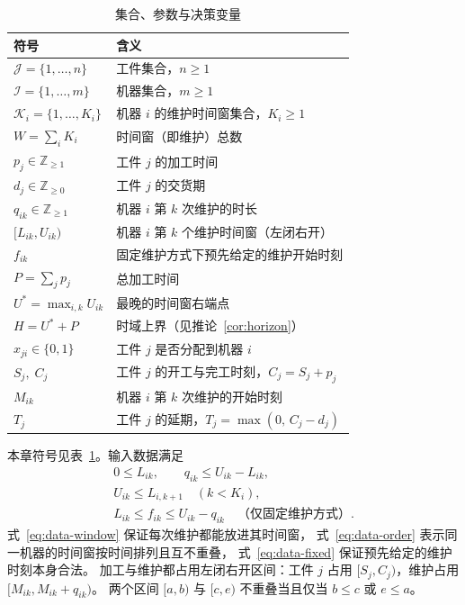 \documentclass[11pt,oneside,notitlepage]{ctexrep}
\theoremstyle{definition}
\theoremstyle{remark}
\newcommand{\cJ}{\mathcal{J}}
\newcommand{\cI}{\mathcal{I}}
\newcommand{\cK}{\mathcal{K}}
\newcommand{\Ustar}{U^{*}}
\begin{document}
\begin{table}[h]
\centering
\caption{集合、参数与决策变量}
\label{tab:notation}
\begin{tabular}{ll}
\toprule
符号 & 含义 \\
\midrule
$\cJ=\{1,\dots,n\}$ & 工件集合，$n\ge 1$ \\
$\cI=\{1,\dots,m\}$ & 机器集合，$m\ge 1$ \\
$\cK_i=\{1,\dots,K_i\}$ & 机器 $i$ 的维护时间窗集合，$K_i\ge 1$ \\
$W=\sum_{i}K_i$ & 时间窗（即维护）总数 \\
\midrule
$p_j\in\mathbb{Z}_{\ge 1}$ & 工件 $j$ 的加工时间 \\
$d_j\in\mathbb{Z}_{\ge 0}$ & 工件 $j$ 的交货期 \\
$q_{ik}\in\mathbb{Z}_{\ge 1}$ & 机器 $i$ 第 $k$ 次维护的时长 \\
$[L_{ik},U_{ik})$ & 机器 $i$ 第 $k$ 个维护时间窗（左闭右开） \\
$f_{ik}$ & 固定维护方式下预先给定的维护开始时刻 \\
$P=\sum_j p_j$ & 总加工时间 \\
$\Ustar=\max_{i,k}U_{ik}$ & 最晚的时间窗右端点 \\
$H=\Ustar+P$ & 时域上界（见推论~\ref{cor:horizon}） \\
\midrule
$x_{ji}\in\{0,1\}$ & 工件 $j$ 是否分配到机器 $i$ \\
$S_j,\;C_j$ & 工件 $j$ 的开工与完工时刻，$C_j=S_j+p_j$ \\
$M_{ik}$ & 机器 $i$ 第 $k$ 次维护的开始时刻 \\
$T_j$ & 工件 $j$ 的延期，$T_j=\max(0,\,C_j-d_j)$ \\
\bottomrule
\end{tabular}
\end{table}

本章符号见表~\ref{tab:notation}。输入数据满足
\begin{gather}
0\le L_{ik},\qquad q_{ik}\le U_{ik}-L_{ik}, \label{eq:data-window}\\
U_{ik}\le L_{i,k+1}\quad (k<K_i), \label{eq:data-order}\\
L_{ik}\le f_{ik}\le U_{ik}-q_{ik}\quad\text{（仅固定维护方式）}. \label{eq:data-fixed}
\end{gather}
式~\eqref{eq:data-window} 保证每次维护都能放进其时间窗，
式~\eqref{eq:data-order} 表示同一机器的时间窗按时间排列且互不重叠，
式~\eqref{eq:data-fixed} 保证预先给定的维护时刻本身合法。
加工与维护都占用左闭右开区间：工件 $j$ 占用 $[S_j,C_j)$，维护占用 $[M_{ik},M_{ik}+q_{ik})$。
两个区间 $[a,b)$ 与 $[c,e)$ 不重叠当且仅当 $b\le c$ 或 $e\le a$。
\end{document}
